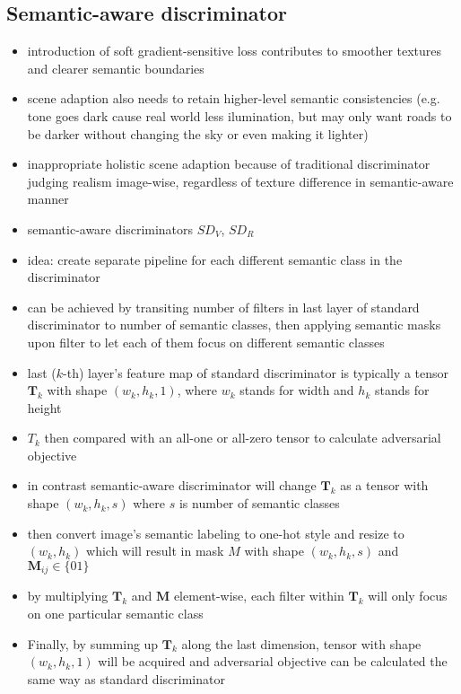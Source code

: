 \subsection{Semantic-aware discriminator}
\begin{itemize}
	\item introduction of soft gradient-sensitive loss contributes to smoother textures and clearer semantic boundaries
	\item scene adaption also needs to retain higher-level semantic consistencies (e.g. tone goes dark cause real world less ilumination, but may only want roads to be darker without changing the sky or even making it lighter)
	\item inappropriate holistic scene adaption because of traditional discriminator judging realism image-wise, regardless of texture difference in semantic-aware manner
	\item semantic-aware discriminators $SD_V$, $SD_R$
	\item idea: create separate pipeline for each different semantic class in the discriminator
	\item can be achieved by transiting number of filters in last layer of standard discriminator to number of semantic classes, then applying semantic masks upon filter to let each of them focus on different semantic classes
	\item last ($k$-th) layer's feature map of standard discriminator is typically a tensor $\mathbf{T}_k$ with shape $(w_k, h_k, 1)$, where $w_k$ stands for width and $h_k$ stands for height
	\item $T_k$ then compared with an all-one or all-zero tensor to calculate adversarial objective
	\item in contrast semantic-aware discriminator will change $\mathbf{T}_k$ as a tensor with shape $(w_k, h_k,s)$ where $s$ is number of semantic classes
	\item then convert image's semantic labeling to one-hot style and resize to $(w_k, h_k)$ which will result in mask $M$ with shape $(w_k, h_k, s)$ and $\mathbf{M}_{ij} \in \{01\}$
	\item by multiplying $\mathbf{T}_k$ and $\mathbf{M}$ element-wise, each filter within $\mathbf{T}_k$ will only focus on one particular semantic class
	\item Finally, by summing up $\mathbf{T}_k$ along the last dimension, tensor with shape $(w_k, h_k, 1)$ will be acquired and adversarial objective can be calculated the same way as standard discriminator
\end{itemize}

